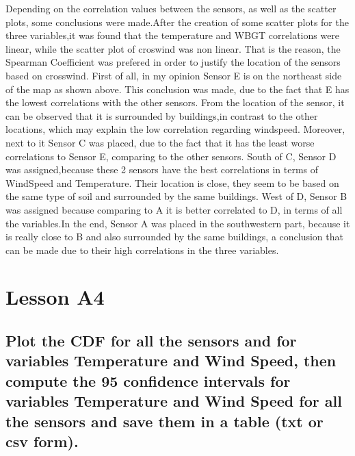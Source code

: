 \documentclass[a4paper,12pt]{article} %
\begin{document}
Depending on the correlation values between the sensors, as well as the scatter plots, some conclusions were made.After the creation of some scatter plots for the three variables,it was found that the temperature and WBGT correlations were linear, while the scatter plot of croswind was non linear. That is the reason, the Spearman Coefficient was prefered in order to justify the location of the sensors based on crosswind. First of all, in my opinion Sensor E is on the northeast side of the map as shown above. This conclusion was made, due to the fact that E has the lowest correlations with the other sensors. From the location of the sensor, it can be observed that it is surrounded by buildings,in contrast to the other locations, which may explain the low correlation regarding windspeed. Moreover, next to it Sensor C was placed, due to the fact that it has the least worse correlations to Sensor E, comparing to the other sensors. South of C, Sensor D was assigned,because these 2 sensors have the best correlations in terms of WindSpeed and Temperature. Their location is close, they seem to be based on the same type of soil and surrounded by the same buildings. West of D, Sensor B was assigned because comparing to A it is better correlated to D, in  terms of all the variables.In the end, Sensor A was placed in the southwestern part, because it is really close to B and also surrounded by the same buildings, a conclusion that can be made due to their high correlations in the three variables.

\section { Lesson A4}

\subsection{Plot the CDF for all the sensors and for variables Temperature and Wind Speed, then compute the 95 confidence intervals for variables Temperature and Wind Speed for all the sensors and save them in a table (txt or csv form).}
\end{document}
